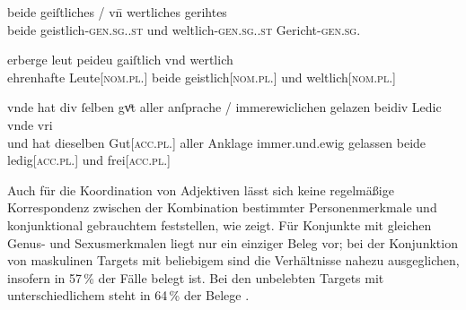 \begin{exe}
\ex \label{ex:caobeidkoordtarg}
	\begin{xlist}
	\ex \label{ex:caobeidkoordtarg_1}
		\gll beide geiſtliches / vn̄ wertliches gerihtes \\
			beide geistlich-\textsc{gen.sg.\NeutI.st} {} und
			weltlich-\textsc{gen.sg.\NeutI.st} Gericht-\textsc{gen.sg.\NeutI} \\
		\trans {}
			\parencites(Nr.~1764, Bamberg, 1293)[71,26]{cao3}

	\ex \label{ex:caobeidkoordtarg_2}
		\gll erberge leut peideu gaiſtlich vnd wertlich \\
			ehrenhafte Leute[\textsc{nom.pl.\MascA}] beide geistlich[\textsc{nom.pl.\MascA}]
			und weltlich[\textsc{nom.pl.\MascA}] \\
		\trans {}
			\parencites(Nr.~1153, Engelthal, Kr.~Nürnberger Land, 1289)[431,44]{cao2}

	\ex \label{ex:caobeidkoordtarg_3}
		\gll vnde hat {div ſelben} gvͦt \textelp{} aller anſprache /
			immerewiclichen gelazen beidiv Ledic vnde vri \\
			und hat dieselben Gut[\textsc{acc.pl.\NeutI}] {} aller Anklage {}
			immer.und.ewig gelassen beide ledig[\textsc{acc.pl.\NeutI}] und
			frei[\textsc{acc.pl.\NeutI}] \\
		\trans {}
			\parencites(Nr.~2293, Bamberg, 1295)[420,21--23]{cao3}
	\end{xlist}
\end{exe}

Auch für die Koordination von Adjektiven lässt sich keine regelmäßige
Korrespondenz zwischen der Kombination bestimmter
Personenmerkmale und konjunktional gebrauchtem 
feststellen, wie  zeigt. Für Konjunkte mit gleichen
Genus- und Sexusmerkmalen liegt nur ein
einziger Beleg vor; bei der Konjunktion von maskulinen Targets mit beliebigem
 sind die Verhältnisse nahezu ausgeglichen, insofern in 57\,\% der
Fälle  belegt ist. Bei den unbelebten Targets mit
unterschiedlichem  steht in 64\,\% der Belege .

